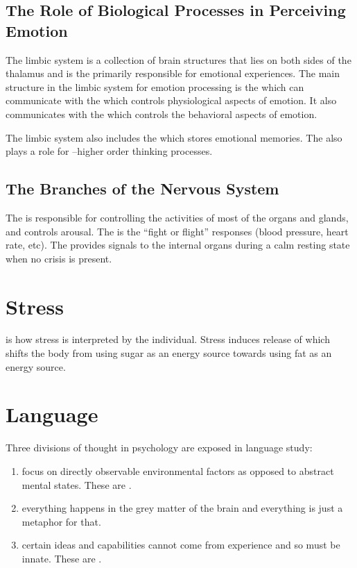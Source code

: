 \documentclass[../Psych_Soci_review.tex]{subfiles}
\begin{document}
\subsection{The Role of Biological Processes in Perceiving Emotion}
The limbic system is a collection of brain structures that lies on both sides of
the thalamus and is the primarily responsible for emotional experiences. The
main structure in the limbic system for emotion processing is the
 which can communicate with the  which
controls physiological aspects of emotion. It also communicates with the
 which controls the behavioral aspects of
emotion.\par

The limbic system also includes the  which stores emotional
memories. The  also plays a role for --higher order thinking processes.

\subsection{The Branches of the Nervous System}
The  is responsible for controlling the
activities of most of the organs and glands, and controls arousal. The
 is the ``fight or flight'' responses
(blood pressure, heart rate, etc). The 
provides signals to the internal organs during a calm resting state when no
crisis is present.

\section{Stress}
 is how stress is interpreted by the individual. Stress
induces release of  which shifts the body from using sugar as
an energy source towards using fat as an energy source.

\section{Language}
Three divisions of thought in psychology are exposed in language study:
\begin{enumerate}
  \item {} focus on directly observable environmental factors
    as opposed to abstract mental states. These are .
  \item {} everything happens in the grey matter of the brain
    and everything is just a metaphor for that. 
  \item {} certain ideas and capabilities cannot come from
    experience and so must be innate. These are .
\end{enumerate}
\end{document}
